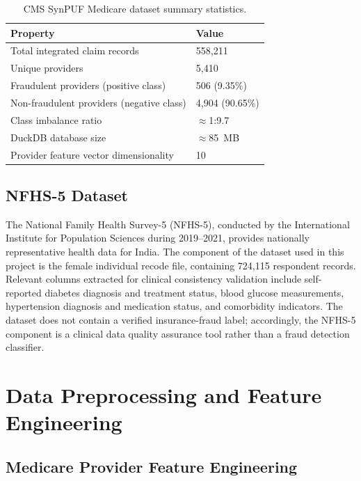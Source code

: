 \begin{table}[htbp]
\centering
\caption{CMS SynPUF Medicare dataset summary statistics.}
\label{tab:exp-datasets}
\begin{tabular}{@{}ll@{}}
\toprule
\textbf{Property} & \textbf{Value} \\
\midrule
Total integrated claim records & 558,211 \\
Unique providers & 5,410 \\
Fraudulent providers (positive class) & 506 (9.35\%) \\
Non-fraudulent providers (negative class) & 4,904 (90.65\%) \\
Class imbalance ratio & $\approx$1:9.7 \\
DuckDB database size & $\approx$85~MB \\
Provider feature vector dimensionality & 10 \\
\bottomrule
\end{tabular}
\end{table}

\subsection{NFHS-5 Dataset}

The National Family Health Survey-5 (NFHS-5), conducted by the International Institute for Population Sciences \cite{b14} during 2019--2021, provides nationally representative health data for India. The component of the dataset used in this project is the female individual recode file, containing 724,115 respondent records. Relevant columns extracted for clinical consistency validation include self-reported diabetes diagnosis and treatment status, blood glucose measurements, hypertension diagnosis and medication status, and comorbidity indicators. The dataset does not contain a verified insurance-fraud label; accordingly, the NFHS-5 component is a clinical data quality assurance tool rather than a fraud detection classifier.

\section{Data Preprocessing and Feature Engineering}
\label{sec:preprocessing}

\subsection{Medicare Provider Feature Engineering}

